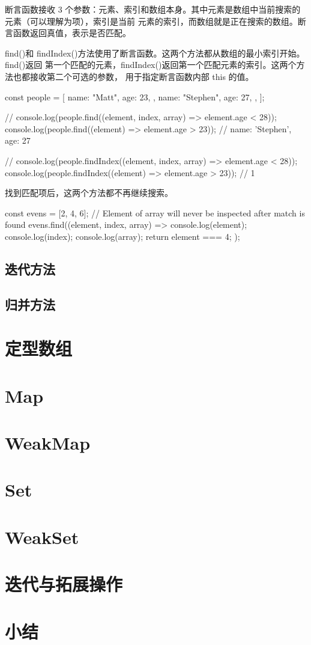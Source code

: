 断言函数接收 3 个参数：元素、索引和数组本身。其中元素是数组中当前搜索的元素（可以理解为项），索引是当前
元素的索引，而数组就是正在搜索的数组。断言函数返回真值，表示是否匹配。

find()和 findIndex()方法使用了断言函数。这两个方法都从数组的最小索引开始。find()返回
第一个匹配的元素，findIndex()返回第一个匹配元素的索引。这两个方法也都接收第二个可选的参数，
用于指定断言函数内部 this 的值。
\begin{js}
const people = [
{
    name: "Matt",
    age: 23,
},
{
    name: "Stephen",
    age: 27,
},
];

// console.log(people.find((element, index, array) => element.age < 28));
console.log(people.find((element) => element.age > 23)); // {name: 'Stephen', age: 27}

// console.log(people.findIndex((element, index, array) => element.age < 28));
console.log(people.findIndex((element) => element.age > 23)); // 1
\end{js}

找到匹配项后，这两个方法都不再继续搜索。

\begin{js}
const evens = [2, 4, 6];
// Element of array will never be inspected after match is found
evens.find((element, index, array) => {
console.log(element);
console.log(index);
console.log(array);
return element === 4;
});
\end{js}
\subsection{迭代方法}
\subsection{归并方法}

\section{定型数组}
\section{Map}
\section{WeakMap}
\section{Set}
\section{WeakSet}
\section{迭代与拓展操作}
\section{小结}